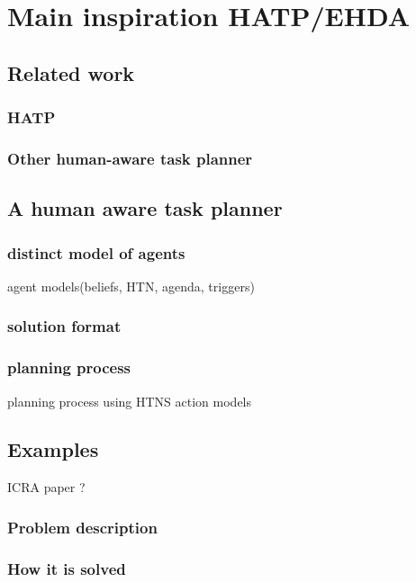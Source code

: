 \ifdefined{}
\else
\setcounter{chapter}{1} %
\dominitoc
\faketableofcontents
\fi

\chapter{Main inspiration HATP/EHDA}
\label{chap:2}
\minitoc

\section{Related work}
\subsection{HATP}
\subsection{Other human-aware task planner}

\section{A human aware task planner}
\subsection{distinct model of agents}
agent models(beliefs, HTN, agenda, triggers)
\subsection{solution format}
\subsection{planning process}
planning process using HTNS action models

\section{Examples}

ICRA paper ?

\subsection{Problem description}
\subsection{How it is solved}
